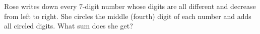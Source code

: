 Rose writes down every $7$-digit number whose digits are all different and decrease from left to right. She circles the middle (fourth) digit of each number and adds all circled digits. What sum does she get?
